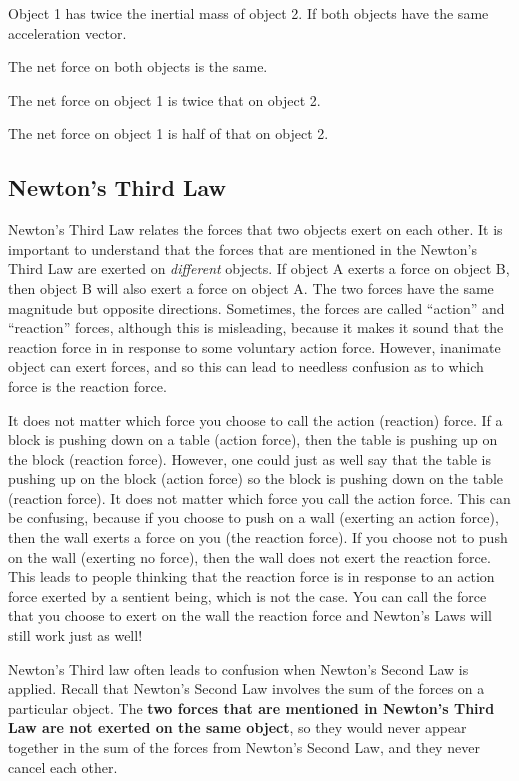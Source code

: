 \begin{checkpointMC}{Object 1 has twice the inertial mass of object 2. If both objects have the same acceleration vector.}
\item The net force on both objects is the same.
\item The net force on object 1 is twice that on object 2. %
\item The net force on object 1 is half of that on object 2.
\end{checkpointMC}


\subsection{Newton's Third Law}
Newton's Third Law relates the forces that two objects exert on each other. It is important to understand that the forces that are mentioned in the Newton's Third Law are exerted on \textit{different} objects. If object A exerts a force on object B, then object B will also exert a force on object A. The two forces have the same magnitude but opposite directions. Sometimes, the forces are called ``action'' and ``reaction'' forces, although this is misleading, because it makes it sound that the reaction force in in response to some voluntary action force. However, inanimate object can exert forces, and so this can lead to needless confusion as to which force is the reaction force.

It does not matter which force you choose to call the action (reaction) force. If a block is pushing down on a table (action force), then the table is pushing up on the block (reaction force). However, one could just as well say that the table is pushing up on the block (action force) so the block is pushing down on the table (reaction force). It does not matter which force you call the action force. This can be confusing, because if you choose to push on a wall (exerting an action force), then the wall exerts a force on you (the reaction force). If you choose not to push on the wall (exerting no force), then the wall does not exert the reaction force. This leads to people thinking that the reaction force is in response to an action force exerted by a sentient being, which is not the case. You can call the force that you choose to exert on the wall the reaction force and Newton's Laws will still work just as well!

Newton's Third law often leads to confusion when Newton's Second Law is applied. Recall that Newton's Second Law involves the sum of the forces on a particular object. The \textbf{two forces that are mentioned in Newton's Third Law are not exerted on the same object}, so they would never appear together in the sum of the forces from Newton's Second Law, and they never cancel each other. 

